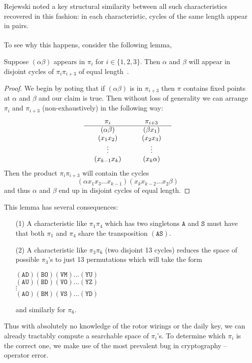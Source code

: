 Rejewski noted a key structural similarity between all such
characteristics recovered in this fashion: in each characteristic,
cycles of the same length appear in pairs.
\\\\To see why this happens, consider the following lemma,
\begin{lemma}
  \label{cillies}
  Suppose $(\alpha\beta)$ appears in $\pi_i$ for $i\in\{1,2,3\}$.
  Then $\alpha$ and $\beta$ will appear in disjoint cycles of
  $\pi_i\pi_{i+3}$ of equal length~\cite[p.~550]{Rejewski1980}.
\end{lemma}
\begin{proof}
  We begin by noting that if $(\alpha\beta)$ is in $\pi_{i+3}$
  then $\pi$ contains fixed points at $\alpha$ and $\beta$ and our
  claim is true. Then without loss of generality we can arrange
  $\pi_{i}$ and $\pi_{i+3}$ (non-exhaustively) in the following way:
  \[
    \setlength{\arraycolsep}{15pt}
    \begin{array}{cc}
      \pi_i      & \pi_{i+3} \\
      \hline
      (\alpha\beta) & (\beta x_1)  \\
      (x_1 x_2)     & (x_2 x_3)    \\
      \vdots        & \vdots       \\
      (x_{k-1} x_k) & (x_k \alpha)
    \end{array}
  \]
  Then the product $\pi_i\pi_{i+3}$ will contain the cycles
  \[
    (\alpha x_1 x_3 \dots x_{k-1} )(x_k
    x_{k-2} \dots x_2 \beta)
  \]
  and thus $\alpha$ and $\beta$ end up in disjoint cycles of equal length.
\end{proof}

\noindent This lemma has several consequences:
\begin{itemize}
  \item[(1)] A characteristic like $\pi_1\pi_4$ which has two
    singletons $\texttt{A}$ and $\texttt{S}$ must have that both $\pi_1$ and
    $\pi_4$ share the transposition $(\texttt{AS})$.
  \item[(2)] A characteristic like $\pi_3\pi_6$ (two disjoint 13
    cycles) reduces the space of possible $\pi_3$'s to just 13
    permutations which will take the form
    \begin{center}
      $(\texttt{AD})(\texttt{BO})(\texttt{VM})\dots(\texttt{YU})$ \\
      $(\texttt{AU})(\texttt{BD})(\texttt{VO})\dots(\texttt{YZ})$ \\
      $\vdots$                                       \\
      $(\texttt{AO})(\texttt{BM})(\texttt{VS})\dots(\texttt{YD})$
    \end{center}
    and similarly for $\pi_6$.
\end{itemize}
Thus with absolutely no knowledge of the rotor wirings or the daily
key, we can already tractably compute a searchable space of
$\pi_i$'s. To determine which $\pi_i$ is the correct one, we
make use of the most prevalent bug in cryptography -- operator error.

